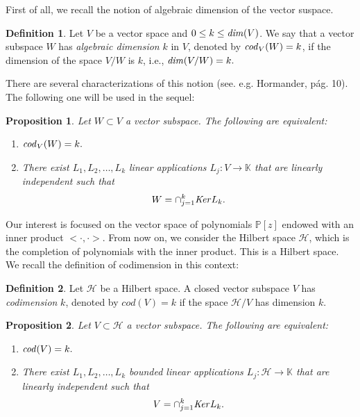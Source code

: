 \documentclass[12pt]{amsart}
\theoremstyle{definition}
\newtheorem{definition}{Definition}
\theoremstyle{plain}
\newtheorem{prop}{Proposition}
\theoremstyle{remark}
\begin{document}
\noindent First of all, we recall the notion of algebraic dimension of the vector suspace.  

\begin{definition} Let $V$ be a vector space and $0 \leq k \leq {\it dim}(V)$.  We say that a vector subspace $W$ has {\it algebraic dimension}   $k$ in $V$, denoted by  ${\it cod}_{V}(W)=k
$, if the dimension of the space  $V/W$  is $k$, i.e., ${\it dim}(V/W)=k.$  
\end{definition}

\noindent There are several characterizations of this notion (see. e.g. Hormander, pág. 10). The following one will be used in the sequel: 
\begin{prop} Let $W\subset V$ a vector subspace.  The following are equivalent: 
\begin{enumerate}
    \item ${\it cod}_{V}(W)=k.$
\item There exist  $L_1,L_2,\dots,L_k$ linear applications $L_j:V \to \mathbb{K}$ that are linearly independent such that 
$$
W=\cap_{j=1}^k {\it Ker} L_k.
$$

\end{enumerate}    
\end{prop}

\noindent Our interest is focused on the vector space of polynomials $\mathbb{P}[z]$ endowed with an inner product $<\cdot,\cdot>$. From now on, we consider the Hilbert space $\mathcal{H}$, which is the completion of polynomials with the inner product. This is a Hilbert space. We recall the definition of codimension in this context: 

\begin{definition} Let $\mathcal{H}$  be a Hilbert space. A closed vector subspace $V$ has {\it codimension} $k$, denoted by $cod(V)=k$ if the space $\mathcal{H}/V$ has dimension $k$.
\end{definition}

\begin{prop} Let $V\subset \mathcal{H}$ a vector subspace.  The following are equivalent: 
\begin{enumerate}
    \item ${\it cod}(V)=k.$
\item There exist  $L_1,L_2,\dots,L_k$ bounded  linear applications $L_j:\mathcal{H} \to \mathbb{K}$ that are linearly independent such that 
$$
V=\cap_{j=1}^k {\it Ker} L_k.
$$

\end{enumerate}    
\end{prop}
\end{document}

